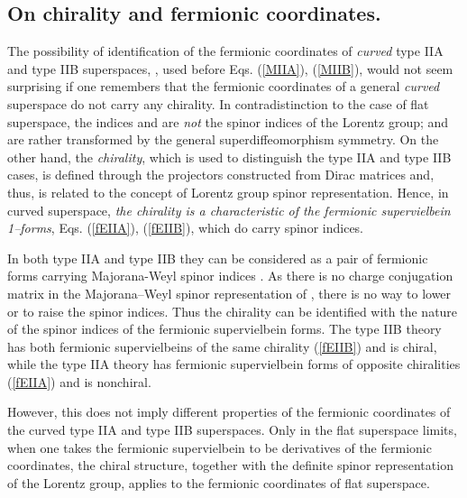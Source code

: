 \documentclass[a4paper,11pt]{article}
\begin{document}
\subsection{On chirality and fermionic coordinates.}

The possibility of identification of the fermionic coordinates 
of {\sl curved} type IIA and type IIB superspaces, 
\myHighlight{$\hat{\theta}^{{\hat{\mu}}}={\theta}^{{{\mu}}}$}\coordHE{},  used 
before Eqs. (\ref{MIIA}), (\ref{MIIB}), would not seem surprising if 
one remembers that the fermionic coordinates of a general 
{\sl curved} superspace do not carry any chirality. 
In contradistinction to the case of flat superspace,  
the indices \myHighlight{$\hat{{\mu}}$}\coordHE{} and \myHighlight{${\mu}$}\coordHE{}   
are {\sl not} the spinor indices of the Lorentz group;  
\myHighlight{$\hat{\theta}^{{\hat{\mu}}}$}\coordHE{} and \myHighlight{${\theta}^{{{\mu}}}$}\coordHE{} are 
rather transformed by the general superdiffeomorphism symmetry. 
On the other hand, the {\sl chirality}, which is used  to distinguish the 
type IIA and type IIB 
cases,  is defined through the projectors constructed from \coordHE{} 
Dirac matrices and, thus, is related to the 
concept of \coordHE{} Lorentz group spinor representation. 
Hence, in curved superspace, {\sl the chirality is a characteristic   
of the fermionic supervielbein 1--forms}, Eqs.   
(\ref{fEIIA}), (\ref{fEIIB}), which do carry \coordHE{} spinor indices. 

In both type IIA and type IIB they  can be considered as 
a pair of fermionic forms carrying Majorana-Weyl \coordHE{} spinor indices
\coordHE{}.
As there is no charge conjugation matrix in the  Majorana--Weyl 
spinor representation of \coordHE{}, there is no way to lower or to raise 
the spinor indices. 
Thus the  chirality can be identified with the nature 
of the spinor indices of the fermionic supervielbein forms. 
The type IIB theory has both fermionic supervielbeins of 
the same chirality (\ref{fEIIB}) and is chiral, while 
the type IIA theory has fermionic supervielbein forms of opposite chiralities
(\ref{fEIIA}) and is nonchiral. 

However, this does not imply 
different properties of the fermionic coordinates of the curved type IIA and 
type IIB superspaces.  
Only in the flat superspace limits, when one takes the fermionic 
supervielbein to be  derivatives of the fermionic coordinates, 
the chiral structure, together  
with the definite spinor representation of the Lorentz group,   
applies to the fermionic coordinates of flat superspace. 
 
\end{document}
